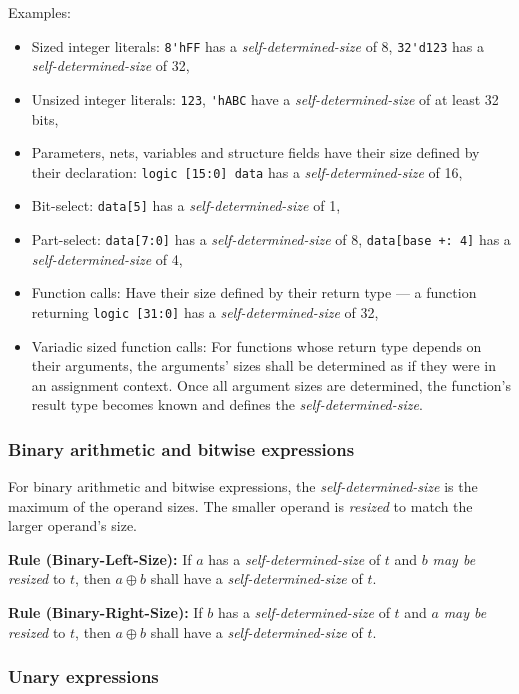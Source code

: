 \documentclass{article}
\newcommand{\sds}{\emph{self-determined-size}}
\newcommand{\mbr}{\emph{may be resized}}
\newenvironment{typingrule}[1]%
{\par\noindent\textbf{Rule (#1):} }%
{\par}
\begin{document}
Examples:

\begin{itemize}
  \item Sized integer literals: \verb|8'hFF| has a \sds{} of 8,
    \verb|32'd123| has a \sds{} of 32,
  \item Unsized integer literals: \verb|123|, \verb|'hABC| have a
    \sds{} of at least 32 bits,
  \item Parameters, nets, variables and structure fields have their size
    defined by their declaration: \verb|logic [15:0] data| has a
    \sds{} of 16,
  \item Bit-select: \verb|data[5]| has a \sds{} of 1,
  \item Part-select: \verb|data[7:0]| has a \sds{} of 8,
    \verb|data[base +: 4]| has a \sds{} of 4,
  \item Function calls: Have their size defined by their return type --- a
    function returning \verb|logic [31:0]| has a
    \sds{} of 32,
  \item Variadic sized function calls: For functions whose return type depends
    on their arguments, the arguments' sizes shall be determined as if
    they were in an assignment context. Once all argument sizes are
    determined, the function's result type becomes known and defines the
    \sds{}.
\end{itemize}

\subsubsection{Binary arithmetic and bitwise expressions}%

For binary arithmetic and bitwise expressions, the \sds{}
is the maximum of the operand sizes. The smaller operand is \emph{resized}
to match the larger operand's size.

\begin{typingrule}{Binary-Left-Size}
  If $a$ has a \sds{} of $t$ and $b$ \mbr{}
  to $t$, then $a \oplus b$ shall have a \sds{} of $t$.
\end{typingrule}

\begin{typingrule}{Binary-Right-Size}
  If $b$ has a \sds{} of $t$ and $a$ \mbr{}
  to $t$, then $a \oplus b$ shall have a \sds{} of $t$.
\end{typingrule}

\subsubsection{Unary expressions}%
\end{document}
